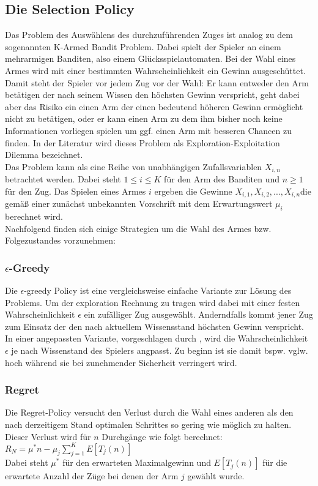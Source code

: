 \subsection{Die Selection Policy}
Das Problem des Auswählens des durchzuführenden Zuges ist analog zu dem sogenannten K-Armed Bandit Problem. Dabei spielt der Spieler an einem mehrarmigen Banditen, also einem Glücksspielautomaten. Bei der Wahl eines Armes wird mit einer bestimmten Wahrscheinlichkeit ein Gewinn ausgeschüttet. Damit steht der Spieler vor jedem Zug vor der Wahl: Er kann entweder den Arm betätigen der nach seinem Wissen den höchsten Gewinn verspricht, geht dabei aber das Risiko ein einen Arm der einen bedeutend höheren Gewinn ermöglicht nicht zu betätigen, oder er kann einen Arm zu dem ihm bisher noch keine Informationen vorliegen spielen um ggf. einen Arm mit besseren Chancen zu finden. In der Literatur wird dieses Problem als Exploration-Exploitation Dilemma bezeichnet.\\
Das Problem kann als eine Reihe von unabhängigen Zufallsvariablen \(X_{ i, n }\) betrachtet werden. Dabei steht \( 1 \leq i \leq K\) für den Arm des Banditen und \(n \geq 1 \) für den Zug. Das Spielen eines Armes \(i\) ergeben die Gewinne \(X_{ i, 1}, X_{ i, 2}, ..., X_{i, n}\)die gemäß einer zunächst unbekannten Vorschrift mit dem Erwartungswert \(\mu_{i}\) berechnet wird. \cite{browne2012survey}\\
Nachfolgend finden sich einige Strategien um die Wahl des Armes bzw. Folgezustandes vorzunehmen:
\subsubsection{$\epsilon$-Greedy}
Die $\epsilon$-greedy Policy ist eine vergleichsweise einfache Variante zur Lösung des Problems. Um der exploration Rechnung zu tragen wird dabei mit einer festen Wahrscheinlichkeit $\epsilon$ ein zufälliger Zug ausgewählt. Anderndfalls kommt jener Zug zum Einsatz der den nach aktuellem Wissensstand höchsten Gewinn verspricht. In einer angepassten Variante, vorgeschlagen durch , wird die Wahrscheinlichkeit $\epsilon$ je nach Wissenstand des Spielers angpasst. Zu beginn ist sie damit bspw. vglw. hoch während sie bei zunehmender Sicherheit verringert wird.
\subsubsection{Regret}
Die Regret-Policy versucht den Verlust durch die Wahl eines anderen als den nach derzeitigem Stand optimalen Schrittes so gering wie möglich zu halten. Dieser Verlust wird für $n$ Durchgänge wie folgt berechnet:\\
$R_{N} = \mu^{*}n-\mu_{j} \sum\limits_{j=1}^{K} E[T_{j}(n)]$\\
Dabei steht $\mu^{*}$ für den erwarteten Maximalgewinn und $E[T_{j}(n)]$ für die erwartete Anzahl der Züge bei denen der Arm $j$ gewählt wurde.
